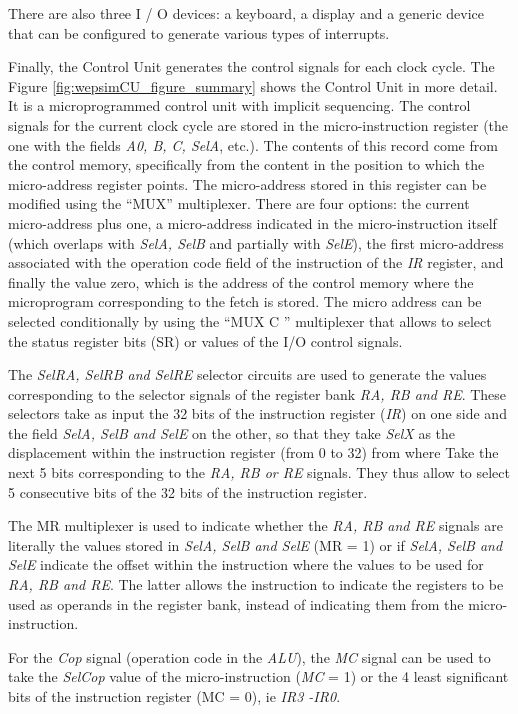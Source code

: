 There are also three I / O devices: a keyboard, a display and a generic device that can be configured to generate various types of interrupts.

Finally, the Control Unit generates the control signals for each clock cycle. The Figure \ref{fig:wepsimCU_figure_summary} shows the Control Unit in more detail. It is a microprogrammed control unit with implicit sequencing. The control signals for the current clock cycle are stored in the micro-instruction register (the one with the fields \emph{A0, B, C, SelA}, etc.). The contents of this record come from the control memory, specifically from the content in the position to which the micro-address register points. The micro-address stored in this register can be modified using the ``MUX'' multiplexer. There are four options: the current micro-address plus one, a micro-address indicated in the micro-instruction itself (which overlaps with \emph{SelA, SelB} and partially with \emph{SelE}), the first micro-address associated with the operation code field of the instruction of the \emph{IR} register, and finally the value zero, which is the address of the control memory where the microprogram corresponding to the fetch is stored. The micro address can be selected conditionally by using the ``MUX C '' multiplexer that allows to select the status register bits (SR) or values of the I/O control signals. 

The \emph{SelRA, SelRB and SelRE} selector circuits are used to generate the values corresponding to the selector signals of the register bank \emph{RA, RB and RE}. These selectors take as input the 32 bits of the instruction register (\emph{IR}) on one side and the field \emph{SelA, SelB and SelE} on the other, so that they take \emph{SelX} as the displacement within the instruction register (from 0 to 32) from where Take the next 5 bits corresponding to the \emph{RA, RB or RE} signals. They thus allow to select 5 consecutive bits of the 32 bits of the instruction register.

The MR multiplexer is used to indicate whether the \emph{RA, RB and RE} signals are literally the values stored in \emph{SelA, SelB and SelE} (MR = 1) or if \emph{SelA, SelB and SelE} indicate the offset within the instruction where the values to be used for \emph{RA, RB and RE}. The latter allows the instruction to indicate the registers to be used as operands in the register bank, instead of indicating them from the micro-instruction.

For the \emph{Cop} signal (operation code in the \emph{ALU}), the \emph{MC} signal can be used to take the \emph{SelCop} value of the micro-instruction (\emph{MC} = 1) or the 4 least significant bits of the instruction register (MC = 0), ie \emph{IR3 -IR0}.

